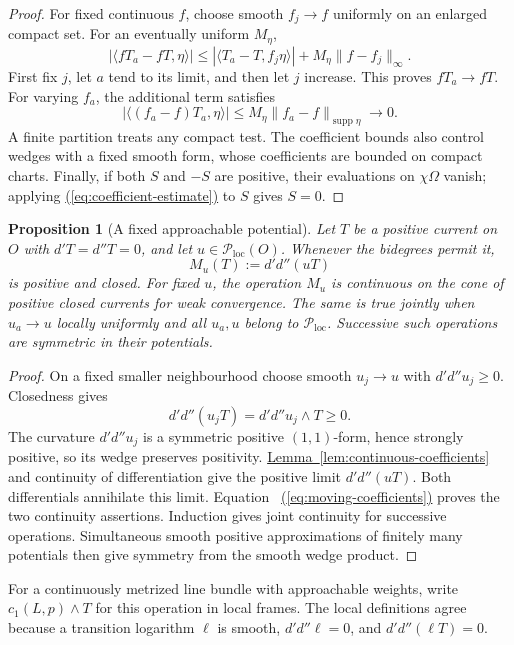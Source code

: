 \documentclass[11pt]{amsart}
\newtheorem{proposition}[theorem]{Proposition}
\theoremstyle{definition}
\theoremstyle{remark}
\numberwithin{equation}{section}
\newcommand{\ddc}{d'd''}
\newcommand{\Ploc}{\mathcal P_{\mathrm{loc}}}
\newcommand{\namedref}[2]{%
 \begingroup
 \ifstrequal{#1}{Section}{\hypersetup{linkcolor=sectionteal}}{%
  \ifstrequal{#1}{Appendix}{\hypersetup{linkcolor=sectionteal}}{}}%
 \hyperref[#2]{#1~\ref*{#2}}%
 \endgroup}
\renewcommand{\eqref}[1]{%
 \begingroup\hypersetup{linkcolor=equationviolet}%
 \hyperref[#1]{\textup{(\ref*{#1})}}%
 \endgroup}
\DeclareMathOperator{\supp}{supp}
\begin{document}
\begin{proof}
For fixed continuous \(f\), choose smooth \(f_j\to f\) uniformly
on an enlarged compact set. For an eventually uniform \(M_\eta\),
\[
 |\langle fT_a-fT,\eta\rangle|
 \leq|\langle T_a-T,f_j\eta\rangle|
       +M_\eta\|f-f_j\|_\infty.
\]
First fix \(j\), let \(a\) tend to its limit, and then let \(j\)
increase. This proves \(fT_a\to fT\).
For varying \(f_a\), the additional term satisfies
\[
 |\langle(f_a-f)T_a,\eta\rangle|
 \leq M_\eta\|f_a-f\|_{\supp\eta}\longrightarrow0.
\]
A finite partition treats any compact test. The coefficient bounds
also control wedges with a fixed smooth form, whose coefficients are
bounded on compact charts. Finally, if both \(S\) and \(-S\) are
positive, their evaluations on \(\chi\Omega\) vanish; applying
\eqref{eq:coefficient-estimate} to \(S\) gives \(S=0\).
\end{proof}

\begin{proposition}[A fixed approachable potential]\label{prop:fixed-potential}
Let \(T\) be a positive current on \(O\) with \(d'T=d''T=0\), and let
\(u\in\Ploc(O)\). Whenever the bidegrees permit it,
\[
 M_u(T):=\ddc(uT)
\]
is positive and closed. For fixed \(u\), the operation \(M_u\) is
continuous on the cone of positive closed currents for weak
convergence. The same is true jointly when \(u_a\to u\) locally
uniformly and all \(u_a,u\) belong to \(\Ploc\).
Successive such operations are symmetric in their potentials.
\end{proposition}

\begin{proof}
On a fixed smaller neighbourhood choose smooth \(u_j\to u\) with
\(\ddc u_j\geq0\). Closedness gives
\[
 \ddc(u_jT)=\ddc u_j\wedge T\geq0.
\]
The curvature \(\ddc u_j\) is a symmetric positive \((1,1)\)-form,
hence strongly positive, so its wedge preserves positivity. \namedref{Lemma}{lem:continuous-coefficients}
and continuity of differentiation give the positive limit
\(\ddc(uT)\). Both differentials annihilate this limit.
Equation~\eqref{eq:moving-coefficients} proves the two continuity
assertions. Induction gives joint continuity for successive
operations. Simultaneous smooth positive approximations of finitely
many potentials then give symmetry from the smooth wedge product.
\end{proof}

For a continuously metrized line bundle with approachable weights, write
\(c_1(L,p)\wedge T\) for this operation in local frames. The local
definitions agree because a transition logarithm \(\ell\) is smooth,
\(\ddc\ell=0\), and \(\ddc(\ell T)=0\).
\end{document}
